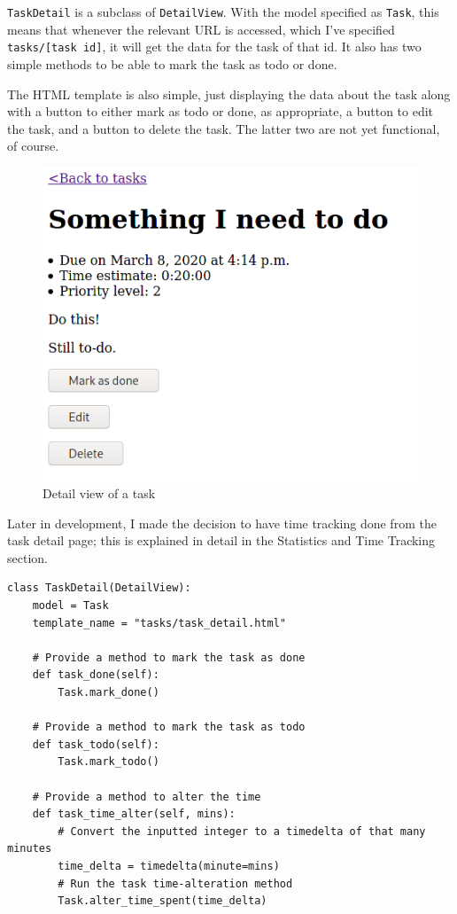 \documentclass{article}
\begin{document}
\texttt{TaskDetail} is a subclass of \texttt{DetailView}.
With the model specified as \texttt{Task},
this means that whenever the relevant URL is accessed,
which I've specified \texttt{tasks/[task id]},
it will get the data for the task of that id.
It also has two simple methods to be able to mark the task as todo or done.

The HTML template is also simple,
just displaying the data about the task along with a button to either mark as todo or done,
as appropriate,
a button to edit the task,
and a button to delete the task.
The latter two are not yet functional,
of course.

\begin{figure}[H]
	\centering
	\includegraphics[width=0.6\linewidth]{Screenshots/task_detail.png}
	\caption{Detail view of a task}
	\label{fig:task_detail1}
\end{figure}

Later in development,
I made the decision to have time tracking done from the task detail page;
this is explained in detail in the Statistics and Time Tracking section.

\begin{lstlisting}
class TaskDetail(DetailView):
    model = Task
    template_name = "tasks/task_detail.html"

    # Provide a method to mark the task as done
    def task_done(self):
        Task.mark_done()

    # Provide a method to mark the task as todo
    def task_todo(self):
        Task.mark_todo()

    # Provide a method to alter the time
    def task_time_alter(self, mins):
        # Convert the inputted integer to a timedelta of that many minutes
        time_delta = timedelta(minute=mins)
        # Run the task time-alteration method
        Task.alter_time_spent(time_delta)
\end{lstlisting}
\end{document}

